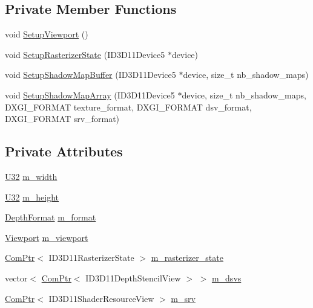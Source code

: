 \subsection*{Private Member Functions}
\begin{DoxyCompactItemize}
\item 
void \hyperlink{structmage_1_1_shadow_map_buffer_aacabad92fb9c0bf81cf2f3c1fbae9f13}{Setup\+Viewport} ()
\item 
void \hyperlink{structmage_1_1_shadow_map_buffer_a4cc23df062cfc02ab1b0fdbe1f56161e}{Setup\+Rasterizer\+State} (I\+D3\+D11\+Device5 $\ast$device)
\item 
void \hyperlink{structmage_1_1_shadow_map_buffer_af1aa6aeab0c71dfd52b97fa7167cac17}{Setup\+Shadow\+Map\+Buffer} (I\+D3\+D11\+Device5 $\ast$device, size\+\_\+t nb\+\_\+shadow\+\_\+maps)
\item 
void \hyperlink{structmage_1_1_shadow_map_buffer_a1da4563b5dc84531f24df51e9e94e154}{Setup\+Shadow\+Map\+Array} (I\+D3\+D11\+Device5 $\ast$device, size\+\_\+t nb\+\_\+shadow\+\_\+maps, D\+X\+G\+I\+\_\+\+F\+O\+R\+M\+AT texture\+\_\+format, D\+X\+G\+I\+\_\+\+F\+O\+R\+M\+AT dsv\+\_\+format, D\+X\+G\+I\+\_\+\+F\+O\+R\+M\+AT srv\+\_\+format)
\end{DoxyCompactItemize}
\subsection*{Private Attributes}
\begin{DoxyCompactItemize}
\item 
\hyperlink{namespacemage_a41c104c036fba3756a74e19f793eeaa1}{U32} \hyperlink{structmage_1_1_shadow_map_buffer_ac8c9e5e52c31c9d358e4bb0f306439a6}{m\+\_\+width}
\item 
\hyperlink{namespacemage_a41c104c036fba3756a74e19f793eeaa1}{U32} \hyperlink{structmage_1_1_shadow_map_buffer_a4e4048bd48e7cd347729f1a675a73ed3}{m\+\_\+height}
\item 
\hyperlink{namespacemage_aed4c3f883a30484d0a20762c06be81d4}{Depth\+Format} \hyperlink{structmage_1_1_shadow_map_buffer_a84ec323bfc88313547f21051b2b70637}{m\+\_\+format}
\item 
\hyperlink{classmage_1_1_viewport}{Viewport} \hyperlink{structmage_1_1_shadow_map_buffer_a5dd4126af774f674f69280f53dd8393d}{m\+\_\+viewport}
\item 
\hyperlink{namespacemage_ae74f374780900893caa5555d1031fd79}{Com\+Ptr}$<$ I\+D3\+D11\+Rasterizer\+State $>$ \hyperlink{structmage_1_1_shadow_map_buffer_a46cf9e88e20431629f6622e3647fd58b}{m\+\_\+rasterizer\+\_\+state}
\item 
vector$<$ \hyperlink{namespacemage_ae74f374780900893caa5555d1031fd79}{Com\+Ptr}$<$ I\+D3\+D11\+Depth\+Stencil\+View $>$ $>$ \hyperlink{structmage_1_1_shadow_map_buffer_acea16328aa086a093ad3f2ef54eb5f4a}{m\+\_\+dsvs}
\item 
\hyperlink{namespacemage_ae74f374780900893caa5555d1031fd79}{Com\+Ptr}$<$ I\+D3\+D11\+Shader\+Resource\+View $>$ \hyperlink{structmage_1_1_shadow_map_buffer_af313b37ddc41f91e949d015086f6ba18}{m\+\_\+srv}
\end{DoxyCompactItemize}


